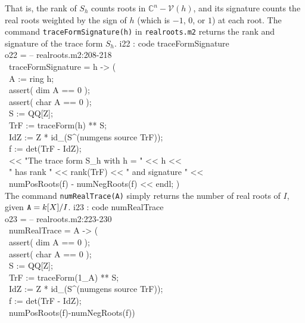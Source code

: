 That is, the rank of $S_h$ counts roots in 
${\mathbb C}^n-{\mathcal V}(h)$, and its signature counts the real roots
weighted by the sign of $h$ (which is $-1$, $0$, or $1$) at each root.
The command {\tt traceFormSignature(h)} in {\tt realroots.m2} returns the
rank and  signature of the trace form $S_h$.
%
\beginOutput
i22 : code traceFormSignature\\
\emptyLine
o22 = -- realroots.m2:208-218\\
\      traceFormSignature = h -> (\\
\           A := ring h;\\
\           assert( dim A == 0 );\\
\           assert( char A == 0 );\\
\           S := QQ[Z];\\
\           TrF := traceForm(h) ** S;\\
\           IdZ := Z * id_(S^(numgens source TrF));\\
\           f := det(TrF - IdZ);\\
\           << "The trace form S_h with h = " << h << \\
\             " has rank " << rank(TrF) << " and signature " << \\
\             numPosRoots(f) - numNegRoots(f) << endl; )\\
\endOutput
%
The \Mtwo{}\/ command {\tt numRealTrace(A)} simply returns the number of
real roots of $I$, given ${\tt A}=k[X]/I$.  
%
\beginOutput
i23 : code numRealTrace\\
\emptyLine
o23 = -- realroots.m2:223-230\\
\      numRealTrace = A -> (\\
\           assert( dim A == 0 );\\
\           assert( char A == 0 );\\
\           S := QQ[Z];\\
\           TrF := traceForm(1_A) ** S;\\
\           IdZ := Z * id_(S^(numgens source TrF));\\
\           f := det(TrF - IdZ);\\
\           numPosRoots(f)-numNegRoots(f))\\
\endOutput
%

